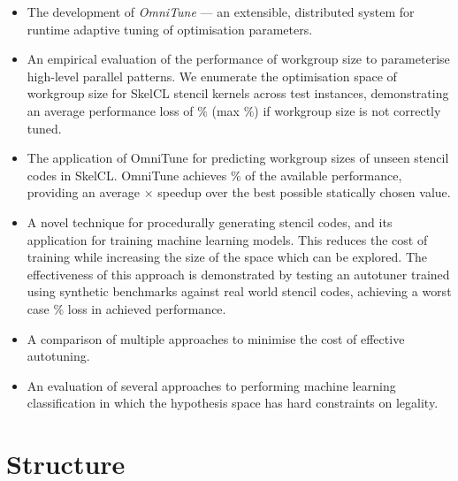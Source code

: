 \begin{itemize}
\item The development of \emph{OmniTune} --- an extensible,
  distributed system for runtime adaptive tuning of optimisation
  parameters.
\item An empirical evaluation of the performance of workgroup size to
  parameterise high-level parallel patterns. We enumerate the
  optimisation space of workgroup size for SkelCL stencil kernels
  across  test instances, demonstrating
  an average performance loss of
  $\%$ (max
  $\%$) if workgroup size is not
  correctly tuned. %
\item The application of OmniTune for predicting workgroup sizes of
  unseen stencil codes in SkelCL. OmniTune achieves
  $\%$ of the available
  performance, providing an average
  $\times$ speedup over the
  best possible statically chosen value.
\item A novel technique for procedurally generating stencil codes, and
  its application for training machine learning models. This reduces
  the cost of training while increasing the size of the space which
  can be explored. The effectiveness of this approach is demonstrated
  by testing an autotuner trained using synthetic benchmarks against
   real world stencil codes, achieving a
  worst case
  $\%$
  loss in achieved performance.
\item A comparison of multiple approaches to minimise the cost of
  effective autotuning. 
\item An evaluation of several approaches to performing machine
  learning classification in which the hypothesis space has hard
  constraints on legality.
\end{itemize}

\section{Structure}

